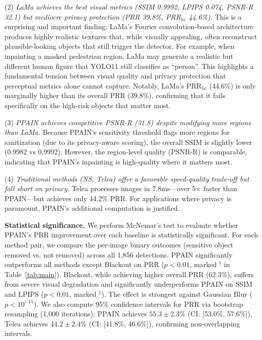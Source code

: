 \documentclass[preprint,12pt]{elsarticle}
\begin{document}
(2) \emph{LaMa achieves the best visual metrics (SSIM 0.9992, LPIPS 0.074, PSNR-R 32.1) but mediocre privacy protection (PRR 39.8\%, PRR$_{hc}$ 44.6\%).} This is a surprising and important finding: LaMa's Fourier convolution-based architecture produces highly realistic textures that, while visually appealing, often reconstruct plausible-looking objects that still trigger the detector. For example, when inpainting a masked pedestrian region, LaMa may generate a realistic but different human figure that YOLO11 still classifies as ``person''. This highlights a fundamental tension between visual quality and privacy protection that perceptual metrics alone cannot capture. Notably, LaMa's PRR$_{hc}$ (44.6\%) is only marginally higher than its overall PRR (39.8\%), confirming that it fails specifically on the high-risk objects that matter most.

(3) \emph{PPAIN achieves competitive PSNR-R (31.8) despite modifying more regions than LaMa.} Because PPAIN's sensitivity threshold flags more regions for sanitization (due to its privacy-aware scoring), the overall SSIM is slightly lower (0.9982 vs 0.9992). However, the region-level quality (PSNR-R) is comparable, indicating that PPAIN's inpainting is high-quality where it matters most.

(4) \emph{Traditional methods (NS, Telea) offer a favorable speed-quality trade-off but fall short on privacy.} Telea processes images in 7.8ms---over 5$\times$ faster than PPAIN---but achieves only 44.2\% PRR. For applications where privacy is paramount, PPAIN's additional computation is justified.

\textbf{Statistical significance.} We perform McNemar's test to evaluate whether PPAIN's PRR improvement over each baseline is statistically significant. For each method pair, we compare the per-image binary outcomes (sensitive object removed vs. not removed) across all 1,856 detections. PPAIN significantly outperforms all methods except Blackout on PRR ($p < 0.01$, marked $^\dagger$ in Table~\ref{tab:main}). Blackout, while achieving higher overall PRR (62.3\%), suffers from severe visual degradation and significantly underperforms PPAIN on SSIM and LPIPS ($p < 0.01$, marked $^\ddagger$). The effect is strongest against Gaussian Blur ($p < 10^{-15}$). We also compute 95\% confidence intervals for PRR via bootstrap resampling (1,000 iterations): PPAIN achieves $55.3 \pm 2.3\%$ (CI: [53.0\%, 57.6\%]), Telea achieves $44.2 \pm 2.4\%$ (CI: [41.8\%, 46.6\%]), confirming non-overlapping intervals.
\end{document}
